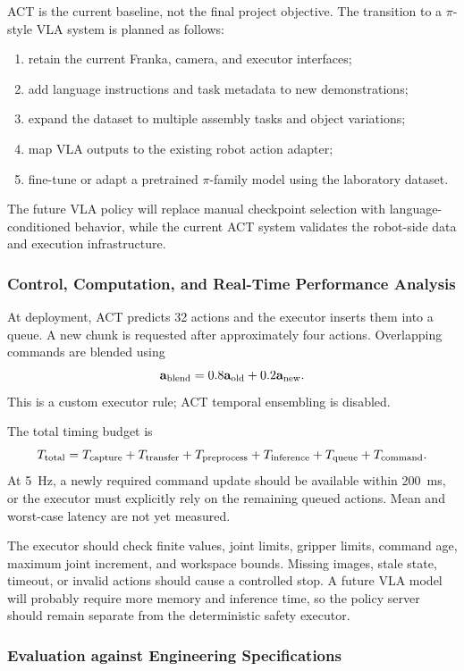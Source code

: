 \documentclass[12pt, letterpaper]{article}
\newcommand{\pistyle}{$\pi$-style}
\begin{document}
ACT is the current baseline, not the final project objective. The transition to a \pistyle{} VLA system is planned as follows:
\begin{enumerate}[label=(\arabic*)]
\item retain the current Franka, camera, and executor interfaces;
\item add language instructions and task metadata to new demonstrations;
\item expand the dataset to multiple assembly tasks and object variations;
\item map VLA outputs to the existing robot action adapter;
\item fine-tune or adapt a pretrained $\pi$-family model using the laboratory dataset.
\end{enumerate}
The future VLA policy will replace manual checkpoint selection with language-conditioned behavior, while the current ACT system validates the robot-side data and execution infrastructure.

\subsubsection{Control, Computation, and Real-Time Performance Analysis}

At deployment, ACT predicts 32 actions and the executor inserts them into a queue. A new chunk is requested after approximately four actions. Overlapping commands are blended using
\[
\mathbf a_{\rm blend}=0.8\mathbf a_{\rm old}+0.2\mathbf a_{\rm new}.
\]
This is a custom executor rule; ACT temporal ensembling is disabled.

The total timing budget is
\[
T_{\rm total}=T_{\rm capture}+T_{\rm transfer}+T_{\rm preprocess}
+T_{\rm inference}+T_{\rm queue}+T_{\rm command}.
\]
At \SI{5}{\hertz}, a newly required command update should be available within \SI{200}{\milli\second}, or the executor must explicitly rely on the remaining queued actions. Mean and worst-case latency are not yet measured.

The executor should check finite values, joint limits, gripper limits, command age, maximum joint increment, and workspace bounds. Missing images, stale state, timeout, or invalid actions should cause a controlled stop. A future VLA model will probably require more memory and inference time, so the policy server should remain separate from the deterministic safety executor.


\subsubsection{Evaluation against Engineering Specifications}
\end{document}
